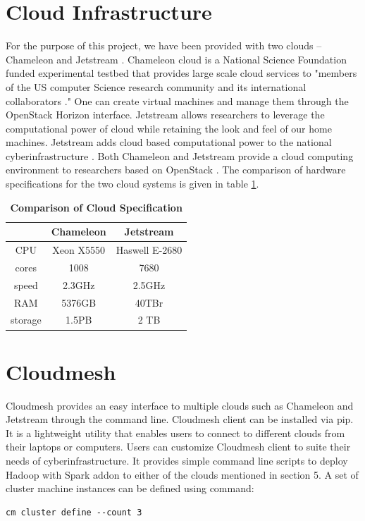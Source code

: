 \documentclass[9pt,twocolumn,twoside]{../../styles/osajnl}
\begin{document}
\section{Cloud Infrastructure}
For the purpose of this project, we have been provided with two clouds
– Chameleon \cite{www-chameleon} and Jetstream \cite{jetsream}
\cite{jetstream2}. Chameleon cloud is a National Science Foundation
funded experimental testbed that provides large scale cloud services
to "members of the US computer Science research community and its
international collaborators \cite{www-chameleon}." One can create
virtual machines and manage them through the OpenStack Horizon
interface. Jetstream allows researchers to leverage the computational
power of cloud while retaining the look and feel of our home
machines. Jetstream adds cloud based computational power to the
national cyberinfrastructure \cite{www-jetstream}. Both Chameleon and
Jetstream provide a cloud computing environment to researchers based
on OpenStack \cite{www-jetstream}. The comparison of hardware
specifications for the two cloud systems is given in table
\ref{tab:compare}.

\begin{table}[htbp]
\centering
\begin{tabular} {| c | c | c | }
\hline & Chameleon & Jetstream \\ [0.5ex] \hline CPU & Xeon X5550 &
Haswell E-2680 \\ \hline cores & 1008 & 7680 \\ \hline speed & 2.3GHz
& 2.5GHz\\ \hline RAM & 5376GB & 40TBr\\ \hline storage & 1.5PB & 2
TB\\ [1ex] \hline
\end{tabular}

\caption{\bf Comparison of Cloud Specification
  \cite{www-jetstream-cloud} \cite{www-chameleon-cloud}}
\label{tab:compare}
\end{table}

\section{Cloudmesh}
Cloudmesh provides an easy interface to multiple clouds such as
Chameleon and Jetstream through the command line. Cloudmesh client can
be installed via pip. It is a lightweight utility that enables users
to connect to different clouds from their laptops or computers. Users
can customize Cloudmesh client to suite their needs of
cyberinfrastructure. It provides simple command line scripts to deploy
Hadoop with Spark addon to either of the clouds mentioned in section
5.  A set of cluster machine instances can be defined using command:
\begin{verbatim} 
cm cluster define --count 3
\end{verbatim}
\end{document}
